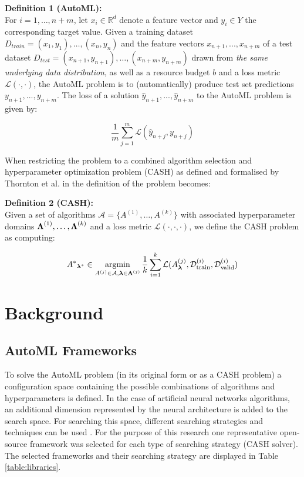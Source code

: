 \documentclass{sig-alternate-br}
\begin{document}
\textbf{Definition 1 (AutoML):} 
\\ For $i = 1, \dots , n + m$, let $x_i \in \mathbb{R}^d$ denote a feature vector and $y_i \in Y$ the corresponding target value. Given a training dataset $D_{train} = {(x_1, y_1),\dots , (x_{n}, y_{n})}$ and
the feature vectors $x_{n+1}, . . . , x_{n+m}$ of a test dataset $D_{test} = {(x_{n+1}, y_{n+1}), \dots ,(x_{n+m}, y_{n+m})}$
drawn from \textit{the same underlying data distribution}, as well as a resource budget $b$ and a loss metric
$\mathcal{L}(\cdot, \cdot)$, the AutoML problem is to (automatically) produce test set predictions $y_{n+1}, . . . , y_{n+m}$. The
loss of a solution $\hat{y}_{n+1}, . . . , \hat{y}_{n+m}$ to the AutoML problem is given by:

\begin{equation}
   \frac{1}{m} \sum_{j=1}^{m} \mathcal{L}( \hat{y}_{n+j},  {y}_{n+j})
\end{equation}

When restricting the problem to a combined algorithm selection and hyperparameter optimization problem (CASH) as defined and formalised by Thornton et al. in \cite{thornton2013autoweka} the definition of the problem becomes:

\textbf{Definition 2 (CASH):}
\\ Given a set of algorithms $\mathcal{A} = \{A^{(1)}, \dots, A^{(k)}\}$ with associated hyperparameter domains ${\boldsymbol{\Lambda}}^{(1)}, \dots, {\boldsymbol{\Lambda}}^{(k)}$ and a loss metric $\mathcal{L}(\cdot, \cdot, \cdot)$, we define the CASH problem as computing:

\begin{equation}
{A^*}_{\vlambda^*} \in \argmin_{A^{(j)} \in \mathcal{A}, \vlambda \in \vLambda^{(j)}} \frac{1}{k}  \sum_{i=1}^{k} \mathcal{L}(A^{(j)}_\vlambda, \mathcal{D}_{\text{train}}^{(i)}, \mathcal{D}_{\text{valid}}^{(i)})
\end{equation}

\vspace{0.25cm}
\section{Background}

\subsection{AutoML Frameworks}
To solve the AutoML problem (in its original form or as a CASH problem) a configuration space containing the possible combinations of algorithms and hyperparameters is defined. In the case of artificial neural networks algorithms, an additional dimension represented by the neural architecture is added to the search space. For searching this space, different searching strategies and techniques can be used \cite{truong2019towards}. For the purpose of this research one representative open-source framework \cite{gijsbers2019open} was selected for each type of searching strategy (CASH solver). The selected frameworks and their searching strategy are displayed in Table \ref{table:libraries}.
\end{document}
